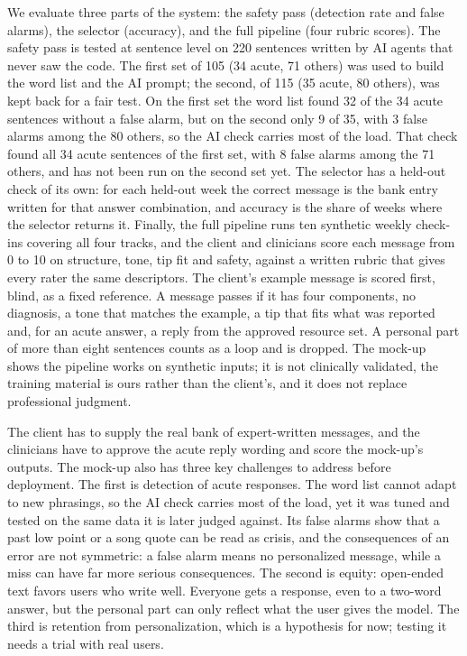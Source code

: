 \documentclass[a4paper]{article}
\begin{document}
We evaluate three parts of the system: the safety pass (detection rate and false alarms), the selector (accuracy), and the full pipeline (four rubric scores). The safety pass is tested at sentence level on 220 sentences written by AI agents that never saw the code. The first set of 105 (34 acute, 71 others) was used to build the word list and the AI prompt; the second, of 115 (35 acute, 80 others), was kept back for a fair test. On the first set the word list found 32 of the 34 acute sentences without a false alarm, but on the second only 9 of 35, with 3 false alarms among the 80 others, so the AI check carries most of the load. That check found all 34 acute sentences of the first set, with 8 false alarms among the 71 others, and has not been run on the second set yet. The selector has a held-out check of its own: for each held-out week the correct message is the bank entry written for that answer combination, and accuracy is the share of weeks where the selector returns it. Finally, the full pipeline runs ten synthetic weekly check-ins covering all four tracks, and the client and clinicians score each message from 0 to 10 on structure, tone, tip fit and safety, against a written rubric that gives every rater the same descriptors. The client's example message is scored first, blind, as a fixed reference. A message passes if it has four components, no diagnosis, a tone that matches the example, a tip that fits what was reported and, for an acute answer, a reply from the approved resource set. A personal part of more than eight sentences counts as a loop and is dropped. The mock-up shows the pipeline works on synthetic inputs; it is not clinically validated, the training material is ours rather than the client's, and it does not replace professional judgment.

The client has to supply the real bank of expert-written messages, and the clinicians have to approve the acute reply wording and score the mock-up's outputs. The mock-up also has three key challenges to address before deployment. The first is detection of acute responses. The word list cannot adapt to new phrasings, so the AI check carries most of the load, yet it was tuned and tested on the same data it is later judged against. Its false alarms show that a past low point or a song quote can be read as crisis, and the consequences of an error are not symmetric: a false alarm means no personalized message, while a miss can have far more serious consequences. The second is equity: open-ended text favors users who write well. Everyone gets a response, even to a two-word answer, but the personal part can only reflect what the user gives the model. The third is retention from personalization, which is a hypothesis for now; testing it needs a trial with real users.
\end{document}

